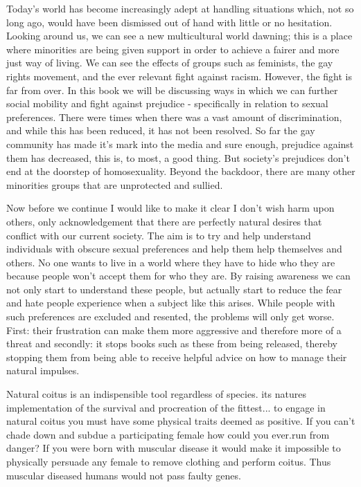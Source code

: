 Today's world has become increasingly adept at handling situations which, not so 
long ago, would have been dismissed out of hand with little or no hesitation. 
Looking around us, we can see a new multicultural world dawning; this is a place 
where minorities are being given support in order to achieve a fairer and more 
just way of living. We can see the effects of groups such as feminists, the gay 
rights movement, and the ever relevant fight against  racism. However, the fight 
is far from over. In this book we will be discussing ways in which we can 
further social mobility and fight against prejudice - specifically in relation 
to sexual preferences. There were times when there was a vast amount of 
discrimination, and while this has been reduced, it has not been resolved. So 
far the gay community has made it’s mark into the media and sure enough, 
prejudice against them has decreased, this is, to most, a good thing. But 
society's prejudices don't end at the doorstep of homosexuality. Beyond the 
backdoor, there are many other minorities groups that are unprotected and 
sullied.

Now before we continue I would like to make it clear I don't wish harm upon 
others, only acknowledgement that there are perfectly natural desires that 
conflict with our current society. The aim is to try and help understand 
individuals with obscure sexual preferences and help them help themselves and 
others. No one wants to live in a world where they have to hide who they are 
because people won't accept them for who they are. By raising awareness we can 
not only start to understand these people, but actually start to reduce the fear 
and hate people experience when a subject like this arises. While people with 
such preferences are excluded and resented, the problems will only get worse. 
First: their frustration can make them more aggressive and therefore more of a 
threat and secondly: it stops books such as these from being released, thereby 
stopping them from being able to receive helpful advice on how to manage their 
natural impulses.


Natural coitus is an indispensible tool regardless of species. its natures 
implementation of the survival and procreation of the fittest... to engage in 
natural coitus you must have some physical traits deemed as positive. If you 
can't chade down and subdue a participating female how could you ever.run from 
danger? If you were born with muscular disease it would make it impossible to 
physically persuade any female to remove clothing and perform coitus. Thus 
muscular diseased humans would not pass faulty genes.

